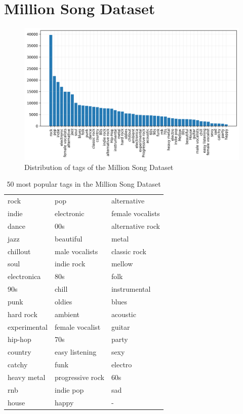 \section{Million Song Dataset}

\begin{figure}[t]
    \centering
    \includegraphics[width=\columnwidth]{figs/tag_stats_msd.png}
    \caption{Distribution of tags of the Million Song Dataset}
    \label{fig:tag_stats_msd}
\end{figure}


\begin{table}[t]
    \centering
    \begin{tabular}{lll}\toprule
        rock & pop & alternative \\
        indie & electronic & female vocalists \\
        dance & 00s & alternative rock \\
        jazz & beautiful & metal \\
        chillout & male vocalists & classic rock \\
        soul & indie rock & mellow \\
        electronica & 80s & folk \\
        90s & chill & instrumental \\
        punk & oldies & blues \\
        hard rock & ambient & acoustic \\
        experimental & female vocalist & guitar \\
        hip-hop & 70s & party \\
        country & easy listening & sexy \\
        catchy & funk & electro \\
        heavy metal & progressive rock & 60s \\
        rnb & indie pop & sad \\
        house & happy & - \\
        \bottomrule
    \end{tabular}
    \caption{50 most popular tags in the Million Song Dataset}
    \label{tab:msd_tags}
\end{table}




